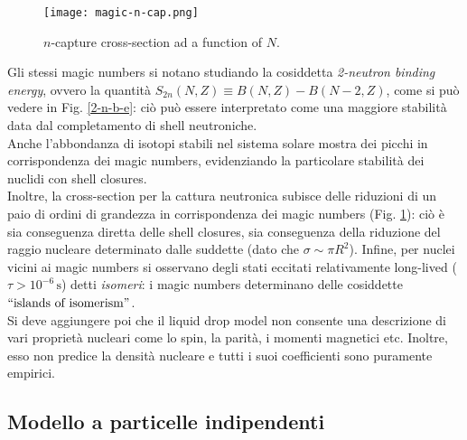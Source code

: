 \begin{figure}[!t]
	\centering
	\texttt{[image: magic-n-cap.png]}
	\caption{$ n $-capture cross-section ad a function of $ N $.}
	\label{n-cap-cr}
\end{figure}

Gli stessi magic numbers si notano studiando la cosiddetta \textit{2-neutron binding energy}, ovvero la quantità $ S_{2n}(N,Z) \equiv B(N,Z) - B(N-2,Z) $, come si può vedere in Fig. \ref{2-n-b-e}: ciò può essere interpretato come una maggiore stabilità data dal completamento di shell neutroniche.\\
Anche l'abbondanza di isotopi stabili nel sistema solare mostra dei picchi in corrispondenza dei magic numbers, evidenziando la particolare stabilità dei nuclidi con shell closures.\\
Inoltre, la cross-section per la cattura neutronica subisce delle riduzioni di un paio di ordini di grandezza in corrispondenza dei magic numbers (Fig. \ref{n-cap-cr}): ciò è sia conseguenza diretta delle shell closures, sia conseguenza della riduzione del raggio nucleare determinato dalle suddette (dato che $ \sigma \sim \pi R^2 $).
Infine, per nuclei vicini ai magic numbers si osservano degli stati eccitati relativamente long-lived ($ \tau > 10^{-6}\,\text{s} $) detti \textit{isomeri}: i magic numbers determinano delle cosiddette $ ``\text{islands of isomerism}" $.\\
Si deve aggiungere poi che il liquid drop model non consente una descrizione di vari proprietà nucleari come lo spin, la parità, i momenti magnetici etc. Inoltre, esso non predice la densità nucleare e tutti i suoi coefficienti sono puramente empirici.

\subsection{Modello a particelle indipendenti}

